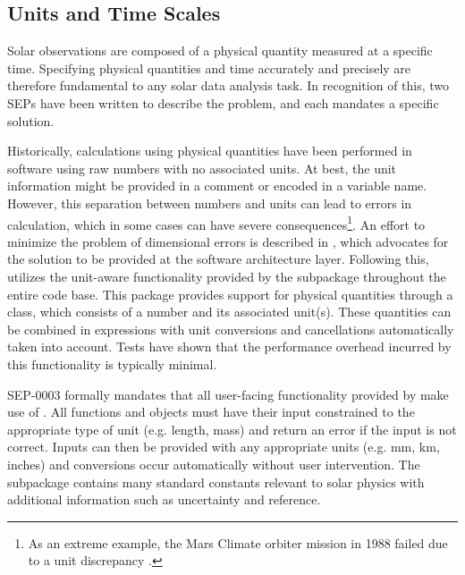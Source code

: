 \subsection{Units and Time Scales}
\label{sec:units}

Solar observations are composed of a physical quantity measured at a specific time.
Specifying physical quantities and time accurately and precisely are therefore fundamental to any solar data analysis task.
In recognition of this, two SEPs have been written to describe the problem, and each mandates a specific solution.

Historically, calculations using physical quantities have been performed in software using raw numbers with no associated units.
At best, the unit information might be provided in a comment or encoded in a variable name.
However, this separation between numbers and units can lead to errors in calculation, which in some cases can have severe consequences\footnote{As an extreme example, the Mars Climate orbiter mission in 1988 failed due to a unit discrepancy \citep{mco_mishap_report}.}.
An effort to minimize the problem of dimensional errors is described in \citet{Damevski2009}, which advocates for the solution to be provided at the software architecture layer.
Following this, \sunpypkg utilizes the unit-aware functionality provided by the  subpackage throughout the entire code base.
This package provides support for physical quantities through a  class, which consists of a number and its associated unit(s).
These quantities can be combined in expressions with unit conversions and cancellations automatically taken into account.
Tests have shown that the performance overhead incurred by this functionality is typically minimal.

SEP-0003 \citep{sep-0003} formally mandates that all user-facing functionality provided by \sunpypkg make use of .
All functions and objects must have their input constrained to the appropriate type of unit (e.g. length, mass) and return an error if the input is not correct.
Inputs can then be provided with any appropriate units (e.g. mm, km, inches) and conversions occur automatically without user intervention.
The  subpackage contains many standard constants relevant to solar physics with additional information such as uncertainty and reference.

